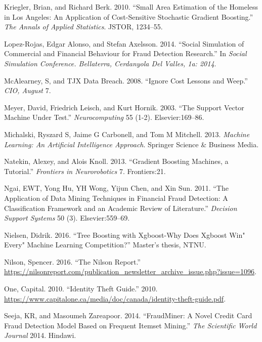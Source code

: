 \documentclass[12pt,]{article}
\begin{document}
\leavevmode\hypertarget{ref-kriegler2010small}{}%
Kriegler, Brian, and Richard Berk. 2010. ``Small Area Estimation of the
Homeless in Los Angeles: An Application of Cost-Sensitive Stochastic
Gradient Boosting.'' \emph{The Annals of Applied Statistics}. JSTOR,
1234--55.

\leavevmode\hypertarget{ref-lopez2014social}{}%
Lopez-Rojas, Edgar Alonso, and Stefan Axelsson. 2014. ``Social
Simulation of Commercial and Financial Behaviour for Fraud Detection
Research.'' In \emph{Social Simulation Conference. Bellaterra,
Cerdanyola Del Valles, 1a: 2014}.

\leavevmode\hypertarget{ref-mcalearney2008ignore}{}%
McAlearney, S, and TJX Data Breach. 2008. ``Ignore Cost Lessons and
Weep.'' \emph{CIO, August} 7.

\leavevmode\hypertarget{ref-meyer2003support}{}%
Meyer, David, Friedrich Leisch, and Kurt Hornik. 2003. ``The Support
Vector Machine Under Test.'' \emph{Neurocomputing} 55 (1-2).
Elsevier:169--86.

\leavevmode\hypertarget{ref-michalski2013machine}{}%
Michalski, Ryszard S, Jaime G Carbonell, and Tom M Mitchell. 2013.
\emph{Machine Learning: An Artificial Intelligence Approach}. Springer
Science \& Business Media.

\leavevmode\hypertarget{ref-natekin2013gradient}{}%
Natekin, Alexey, and Alois Knoll. 2013. ``Gradient Boosting Machines, a
Tutorial.'' \emph{Frontiers in Neurorobotics} 7. Frontiers:21.

\leavevmode\hypertarget{ref-ngai2011application}{}%
Ngai, EWT, Yong Hu, YH Wong, Yijun Chen, and Xin Sun. 2011. ``The
Application of Data Mining Techniques in Financial Fraud Detection: A
Classification Framework and an Academic Review of Literature.''
\emph{Decision Support Systems} 50 (3). Elsevier:559--69.

\leavevmode\hypertarget{ref-nielsen2016tree}{}%
Nielsen, Didrik. 2016. ``Tree Boosting with Xgboost-Why Does Xgboost
Win" Every" Machine Learning Competition?'' Master's thesis, NTNU.

\leavevmode\hypertarget{ref-nilson2016nilson}{}%
Nilson, Spencer. 2016. ``The Nilson Report.''
\url{https://nilsonreport.com/publication_newsletter_archive_issue.php?issue=1096}.

\leavevmode\hypertarget{ref-capitaloneguide}{}%
One, Capital. 2010. ``Identity Theft Guide.'' 2010.
\url{https://www.capitalone.ca/media/doc/canada/identity-theft-guide.pdf}.

\leavevmode\hypertarget{ref-seeja2014fraudminer}{}%
Seeja, KR, and Masoumeh Zareapoor. 2014. ``FraudMiner: A Novel Credit
Card Fraud Detection Model Based on Frequent Itemset Mining.'' \emph{The
Scientific World Journal} 2014. Hindawi.
\end{document}
